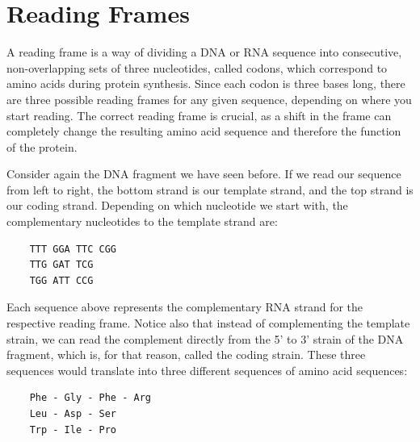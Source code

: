 \section{Reading Frames}

A reading frame is a way of dividing a DNA or RNA sequence into consecutive, non-overlapping sets of three nucleotides, called codons, which correspond to amino acids during protein synthesis. Since each codon is three bases long, there are three possible reading frames for any given sequence, depending on where you start reading. The correct reading frame is crucial, as a shift in the frame can completely change the resulting amino acid sequence and therefore the function of the protein.

Consider again the DNA fragment we have seen before. If we read our sequence from left to right, the bottom strand is our template strand, and the top strand is our coding strand. Depending on which nucleotide we start with, the complementary nucleotides to the template strand are:

\begin{verbatim}
    TTT GGA TTC CGG
    TTG GAT TCG
    TGG ATT CCG
\end{verbatim}

Each sequence
above represents the complementary RNA strand for the respective reading frame. Notice also that instead of complementing the template strain, we can read the complement directly from the 5' to 3' strain of the DNA fragment, which is, for that reason, called the coding strain. These three sequences would translate into three different sequences of amino acid sequences:
%
\begin{verbatim}
    Phe - Gly - Phe - Arg
    Leu - Asp - Ser
    Trp - Ile - Pro
\end{verbatim}

